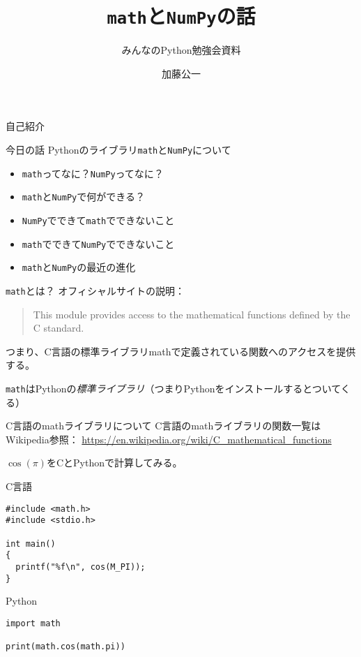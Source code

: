 \documentclass[unicode,lualatex]{beamer}
\title{{\tt math}と{\tt NumPy}の話}
\subtitle{みんなのPython勉強会資料}
\date{}
\author{加藤公一}
\begin{document}
\begin{frame}
 \titlepage
\end{frame}
\begin{frame}[fragile]{自己紹介}
\end{frame}
\begin{frame}[fragile]{今日の話}
  Pythonのライブラリ{\tt math}と{\tt NumPy}について
  \begin{itemize}
  \item {\tt math}ってなに？{\tt NumPy}ってなに？
  \item {\tt math}と{\tt NumPy}で何ができる？
  \item {\tt NumPy}でできて{\tt math}でできないこと
  \item {\tt math}でできて{\tt NumPy}でできないこと
  \item {\tt math}と{\tt NumPy}の最近の進化
  \end{itemize}
\end{frame}
\begin{frame}[fragile]{{\tt math}とは？}
  オフィシャルサイトの説明：
  \begin{quote}
    This module provides access to the mathematical functions defined by the C standard.
  \end{quote}

  つまり、C言語の標準ライブラリmathで定義されている関数へのアクセスを提供する。

  {\tt math}はPythonの\emph{標準ライブラリ}（つまりPythonをインストールするとついてくる）
\end{frame}
\begin{frame}[fragile]{C言語のmathライブラリについて}
  C言語のmathライブラリの関数一覧はWikipedia参照：\newline
  {\tiny \url{https://en.wikipedia.org/wiki/C_mathematical_functions}}

$\cos(\pi)$をCとPythonで計算してみる。
\begin{minipage}[t]{0.45 \textwidth}
\fontsize{6pt}{6pt}\selectfont    
\noindent  
C言語
\begin{verbatim}
#include <math.h>
#include <stdio.h>

int main()
{
  printf("%f\n", cos(M_PI));
}
\end{verbatim}
\end{minipage}
\begin{minipage}[t]{0.45 \textwidth}
\fontsize{6pt}{6pt}\selectfont    
\noindent  
Python
\begin{verbatim}
import math

print(math.cos(math.pi))
\end{verbatim}
\end{minipage}
\end{frame}
\end{document}
